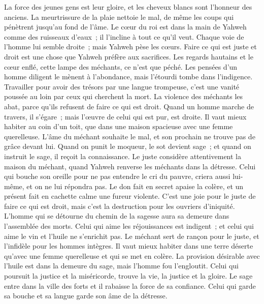 \begin{multicols}{2}
La force des jeunes gens est leur gloire, et les cheveux blancs sont l'honneur des anciens.
La meurtrissure de la plaie nettoie le mal, de même les coups qui pénètrent jusqu'au fond de l'âme.
\VerseOne{}Le cœur du roi est dans la main de Yahweh comme des ruisseaux d'eaux~; il l'incline à tout ce qu'il veut.
Chaque voie de l'homme lui semble droite~; mais Yahweh pèse les cœurs.
Faire ce qui est juste et droit est une chose que Yahweh préfère aux sacrifices.
Les regards hautains et le cœur enflé, cette lampe des méchants, ce n'est que péché.
Les pensées d'un homme diligent le mènent à l'abondance, mais l'étourdi tombe dans l'indigence.
Travailler pour avoir des trésors par une langue trompeuse, c'est une vanité poussée au loin par ceux qui cherchent la mort.
La violence des méchants les abat, parce qu'ils refusent de faire ce qui est droit.
Quand un homme marche de travers, il s'égare~; mais l'œuvre de celui qui est pur, est droite.
Il vaut mieux habiter au coin d'un toit, que dans une maison spacieuse avec une femme querelleuse.
L'âme du méchant souhaite le mal, et son prochain ne trouve pas de grâce devant lui.
Quand on punit le moqueur, le sot devient sage~; et quand on instruit le sage, il reçoit la connaissance.
Le juste considère attentivement la maison du méchant, quand Yahweh renverse les méchants dans la détresse.
Celui qui bouche son oreille pour ne pas entendre le cri du pauvre, criera aussi lui-même, et on ne lui répondra pas.
Le don fait en secret apaise la colère, et un présent fait en cachette calme une fureur violente.
C'est une joie pour le juste de faire ce qui est droit, mais c'est la destruction pour les ouvriers d'iniquité.
L'homme qui se détourne du chemin de la sagesse aura sa demeure dans l'assemblée des morts.
Celui qui aime les réjouissances est indigent~; et celui qui aime le vin et l'huile ne s'enrichit pas.
Le méchant sert de rançon pour le juste, et l'infidèle pour les hommes intègres.
Il vaut mieux habiter dans une terre déserte qu'avec une femme querelleuse et qui se met en colère.
La provision désirable avec l'huile est dans la demeure du sage, mais l'homme fou l'engloutit.
Celui qui poursuit la justice et la miséricorde, trouve la vie, la justice et la gloire.
Le sage entre dans la ville des forts et il rabaisse la force de sa confiance.
Celui qui garde sa bouche et sa langue garde son âme de la détresse.

\end{multicols}
